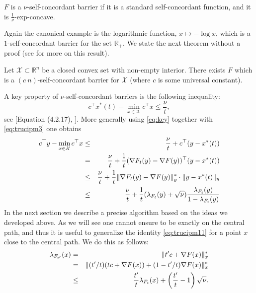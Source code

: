 \documentclass[openany]{now}
\newcommand{\R}{\mathbb{R}}
\begin{document}
\begin{definition}
$F$ is a $\nu$-self-concordant barrier if it is a standard self-concordant function, and it is $\frac1{\nu}$-exp-concave.
\end{definition}
Again the canonical example is the logarithmic function, $x \mapsto - \log x$, which is a $1$-self-concordant barrier for the set $\R_{+}$. We state the next theorem without a proof (see \cite{BE14} for more on this result).

\begin{theorem}
Let $\mathcal{X} \subset \R^n$ be a closed convex set with non-empty interior. There exists $F$ which is a $(c \ n)$-self-concordant barrier for $\mathcal{X}$ (where $c$ is some universal constant).
\end{theorem}
A key property of $\nu$-self-concordant barriers is the following inequality:
\begin{equation} \label{eq:key}
c^{\top} x^*(t) - \min_{x \in \mathcal{X}} c^{\top} x \leq \frac{\nu}{t} ,
\end{equation}
see [Equation (4.2.17), \cite{Nes04}]. More generally using \eqref{eq:key} together with \eqref{eq:trucipm3} one obtains
\begin{eqnarray}
c^{\top} y- \min_{x \in \mathcal{X}} c^{\top} x & \leq & \frac{\nu}{t} + c^{\top} (y - x^*(t)) \notag \\
& = & \frac{\nu}{t} + \frac{1}{t} (\nabla F_t(y) - \nabla F(y))^{\top} (y - x^*(t)) \notag \\ 
& \leq & \frac{\nu}{t} + \frac{1}{t} \|\nabla F_t(y) - \nabla F(y)\|_y^* \cdot \|y - x^*(t)\|_y \notag \\
& \leq & \frac{\nu}{t} + \frac{1}{t} (\lambda_{F_t}(y) + \sqrt{\nu})\frac{\lambda_{F_t} (y)}{1 - \lambda_{F_t}(y)} \label{eq:trucipm4}
\end{eqnarray}
In the next section we describe a precise algorithm based on the ideas we developed above. As we will see one cannot ensure to be exactly on the central path, and thus it is useful to generalize the identity \eqref{eq:trucipm11} for a point $x$ close to the central path. We do this as follows:
\begin{eqnarray}
\lambda_{F_{t'}}(x) & = & \|t' c + \nabla F(x)\|_x^* \notag \\
& = &  \|(t' / t) (t c + \nabla F(x)) + (1- t'/t) \nabla F(x)\|_x^* \notag \\
& \leq & \frac{t'}{t} \lambda_{F_t}(x) + \left(\frac{t'}{t} - 1\right) \sqrt{\nu} .\label{eq:trucipm12}
\end{eqnarray}
\end{document}
